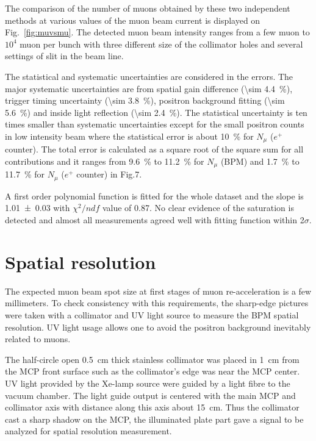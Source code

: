 \documentclass[preprint,3p,twocolumn]{elsarticle}
\begin{document}
The comparison of the number of muons obtained by these two independent methods at various values of the muon beam current is displayed on Fig.~\ref{fig:muvsmu}. The detected muon beam intensity ranges from a few muon to $10^{4}$ muon per bunch with three different size of the collimator holes and several settings of slit in the beam line.

The statistical and systematic uncertainties are considered in the errors. The major systematic uncertainties are from spatial gain difference (\SI{\sim 4.4}{\percent}), trigger timing uncertainty (\SI{\sim 3.8}{\percent}),
positron background fitting (\SI{\sim 5.6}{\percent}) and inside light reflection (\SI{\sim 2.4}{\percent}).
The statistical uncertainty is ten times smaller than systematic uncertainties except for the small positron counts in low intensity beam where the statistical error is about \SI{10}{\percent} for $N_\mu$ ($e^+$ counter).
The total error is calculated as a square root of the square sum for all contributions and it ranges from \SI{9.6}{\percent} to \SI{11.2}{\percent} for $N_\mu$ (BPM) and \SI{1.7}{\percent} to \SI{11.7}{\percent} for $N_\mu$ ($e^+$ counter) in Fig.7.

A first order polynomial function is fitted for the whole dataset and the slope is \num{1.01 \pm 0.03} with $\chi^{2}/ndf$ value of 0.87. No clear evidence of the saturation is detected and almost all measurements agreed well with fitting function within 2$\sigma$.  

\section{Spatial resolution}
 
The expected muon beam spot size at first stages of muon re-acceleration is a few millimeters.
To check consistency with this requirements, the sharp-edge pictures were taken with a collimator and UV light source to measure the BPM spatial resolution.
UV light usage allows one to avoid the positron background inevitably related to muons.

The half-circle open \SI{.5}{\cm} thick stainless collimator was placed in \SI{1}{\cm} from the MCP front surface
such as the collimator's edge was near the MCP center.
UV light provided by the Xe-lamp source were guided by a light fibre to the vacuum chamber.
The light guide output is centered with the main MCP and collimator axis
with distance along this axis about \SI{15}{\cm}.
Thus the collimator cast a sharp shadow on the MCP,
the illuminated plate part gave a signal to be analyzed for spatial resolution measurement.
\end{document}
